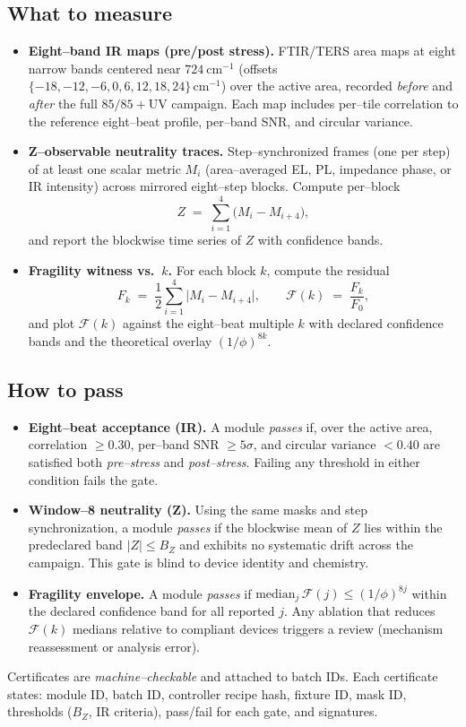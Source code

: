 \documentclass[12pt]{article}
\begin{document}
\subsection*{What to measure}
\begin{itemize}
  \item \textbf{Eight–band IR maps (pre/post stress).} FTIR/TERS area maps at eight narrow bands centered near $724~\mathrm{cm}^{-1}$ (offsets $\{-18,-12,-6,0,6,12,18,24\}\,\mathrm{cm}^{-1}$) over the active area, recorded \emph{before} and \emph{after} the full $85/85{+}\mathrm{UV}$ campaign. Each map includes per–tile correlation to the reference eight–beat profile, per–band SNR, and circular variance.
  \item \textbf{Z–observable neutrality traces.} Step–synchronized frames (one per step) of at least one scalar metric $M_i$ (area–averaged EL, PL, impedance phase, or IR intensity) across mirrored eight–step blocks. Compute per–block
  \[
  Z \;=\; \sum_{i=1}^{4}\big(M_i - M_{i+4}\big),
  \]
  and report the blockwise time series of $Z$ with confidence bands.
  \item \textbf{Fragility witness vs.\ $k$.} For each block $k$, compute the residual
  \[
  F_k \;=\; \frac{1}{2}\sum_{i=1}^{4}\big|M_i - M_{i+4}\big|,\qquad 
  \mathcal{F}(k)\;=\;\frac{F_k}{F_0},
  \]
  and plot $\mathcal{F}(k)$ against the eight–beat multiple $k$ with declared confidence bands and the theoretical overlay $(1/\phi)^{8k}$.
\end{itemize}

\subsection*{How to pass}
\begin{itemize}
  \item \textbf{Eight–beat acceptance (IR).} A module \emph{passes} if, over the active area, correlation $\ge 0.30$, per–band SNR $\ge 5\sigma$, and circular variance $<0.40$ are satisfied both \emph{pre–stress} and \emph{post–stress}. Failing any threshold in either condition fails the gate.
  \item \textbf{Window–8 neutrality (Z).} Using the same masks and step synchronization, a module \emph{passes} if the blockwise mean of $Z$ lies within the predeclared band $|Z|\le B_Z$ and exhibits no systematic drift across the campaign. This gate is blind to device identity and chemistry.
  \item \textbf{Fragility envelope.} A module \emph{passes} if $\mathrm{median}_j\,\mathcal{F}(j)\le (1/\phi)^{8j}$ within the declared confidence band for all reported $j$. Any ablation that reduces $\mathcal{F}(k)$ medians relative to compliant devices triggers a review (mechanism reassessment or analysis error).
\end{itemize}
Certificates are \emph{machine–checkable} and attached to batch IDs. Each certificate states: module ID, batch ID, controller recipe hash, fixture ID, mask ID, thresholds ($B_Z$, IR criteria), pass/fail for each gate, and signatures.
\end{document}
